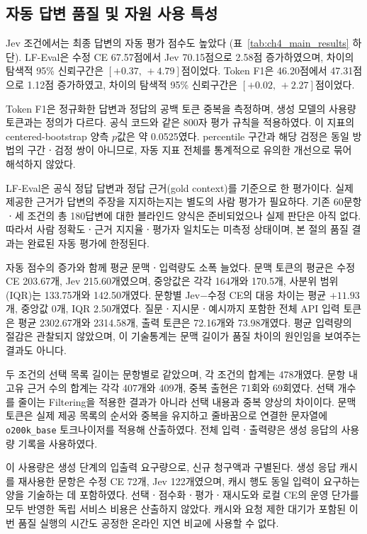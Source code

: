 \subsection{자동 답변 품질 및 자원 사용 특성}
\label{sec:ch4_answer_resources}

Jev 조건에서는 최종 답변의 자동 평가 점수도 높았다
(표~\ref{tab:ch4_main_results} 하단). LF-Eval은 수정 CE 67.57점에서
Jev 70.15점으로 2.58점 증가하였으며, 차이의 탐색적 95\% 신뢰구간은
$[+0.37,\,+4.79]$점이었다.
Token F1은 46.20점에서 47.31점으로 1.12점 증가하였고,
차이의 탐색적 95\% 신뢰구간은 $[+0.02,\,+2.27]$점이었다.

Token F1은 정규화한 답변과 정답의 공백 토큰 중복을 측정하며,
생성 모델의 사용량 토큰과는 정의가 다르다. 공식 코드와 같은 800자
평가 규칙을 적용하였다. 이 지표의 centered-bootstrap 양측 $p$값은
약 0.0525였다. percentile 구간과 해당 검정은 동일 방법의 구간ㆍ검정
쌍이 아니므로, 자동 지표 전체를 통계적으로 유의한 개선으로 묶어
해석하지 않았다.

LF-Eval은 공식 정답 답변과 정답 근거(gold context)를 기준으로 한
평가이다. 실제 제공한 근거가 답변의 주장을 지지하는지는 별도의
사람 평가가 필요하다. 기존 60문항ㆍ세 조건의 총 180답변에 대한
블라인드 양식은 준비되었으나 실제 판단은 아직 없다. 따라서 사람
정확도ㆍ근거 지지율ㆍ평가자 일치도는 미측정 상태이며, 본 절의
품질 결과는 완료된 자동 평가에 한정된다.

자동 점수의 증가와 함께 평균 문맥ㆍ입력량도 소폭 늘었다.
문맥 토큰의 평균은 수정 CE 203.67개, Jev 215.60개였으며,
중앙값은 각각 164개와 170.5개, 사분위 범위(IQR)는
133.75개와 142.50개였다. 문항별 Jev$-$수정 CE의 대응 차이는
평균 $+11.93$개, 중앙값 0개, IQR 2.50개였다.
질문ㆍ지시문ㆍ예시까지 포함한 전체 API 입력 토큰은 평균
2302.67개와 2314.58개, 출력 토큰은 72.16개와 73.98개였다.
평균 입력량의 절감은 관찰되지 않았으며, 이 기술통계는 문맥 길이가
품질 차이의 원인임을 보여주는 결과도 아니다.

두 조건의 선택 목록 길이는 문항별로 같았으며, 각 조건의 합계는
478개였다. 문항 내 고유 근거 수의 합계는 각각 407개와 409개,
중복 출현은 71회와 69회였다. 선택 개수를 줄이는 Filtering을 적용한
결과가 아니라 선택 내용과 중복 양상의 차이이다.
문맥 토큰은 실제 제공 목록의 순서와 중복을 유지하고 줄바꿈으로
연결한 문자열에 \texttt{o200k\_base} 토크나이저를 적용해 산출하였다.
전체 입력ㆍ출력량은 생성 응답의 사용량 기록을 사용하였다.

이 사용량은 생성 단계의 입출력 요구량으로, 신규 청구액과 구별된다.
생성 응답 캐시를 재사용한 문항은 수정 CE 72개, Jev 122개였으며,
캐시 행도 동일 입력이 요구하는 양을 기술하는 데 포함하였다.
선택ㆍ점수화ㆍ평가ㆍ재시도와 로컬 CE의 운영 단가를 모두 반영한
독립 서비스 비용은 산출하지 않았다. 캐시와 요청 제한 대기가 포함된
이번 품질 실행의 시간도 공정한 온라인 지연 비교에 사용할 수 없다.
